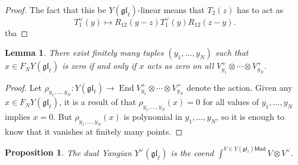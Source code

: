 \documentclass[11pt]{report}
\newtheorem{lemma}[theorem]{Lemma}
\newtheorem{prop}[theorem]{Proposition}
\theoremstyle{definition}
\theoremstyle{remark}
\theoremstyle{remark}
\newcommand{\End}{\operatorname{End}}
\begin{document}
\begin{proof}
The fact that this be $Y(\mathfrak{gl}_\ell)$-linear means that $T_2(z)$ has to act as
\begin{equation*}
T_1^\vee(y) \mapsto R_{12}(y-z) T_1^\vee(y) R_{12}(z-y).
\end{equation*}
tba
\end{proof}

\begin{lemma}
There exist finitely many tuples $(y_1,...,y_N)$ such that $x \in F_N Y(\mathfrak{gl}_\ell)$ is zero if and only if $x$ acts as zero on all $V_{y_1}^+ \otimes \cdots \otimes V_{y_N}^+$.
\end{lemma}

\begin{proof}
Let $\rho_{y_1,...,y_N}: Y(\mathfrak{gl}_\ell) \to \End V_{y_1}^+ \otimes \cdots \otimes V_{y_N}^+$ denote the action. Given any $x \in F_N Y(\mathfrak{gl}_\ell)$, it is a result of \cite{article:nazarov:2019} that $\rho_{y_1,...,y_N}(x) = 0$ for all values of $y_1,...,y_N$ implies $x = 0$. But $\rho_{y_1,...,y_N}(x)$ is polynomial in $y_1,...,y_N$, so it is enough to know that it vanishes at finitely many points.
\end{proof}

\begin{prop}
The dual Yangian $Y^\vee(\mathfrak{gl}_\ell)$ is the coend $\int^{V \in Y(\mathfrak{gl}_\ell)\mathsf{Mod}} V \otimes V^\vee$.
\end{prop}
\end{document}
